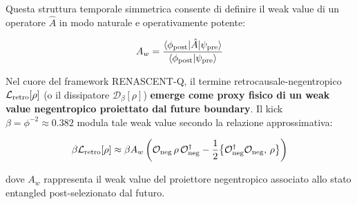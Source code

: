 \documentclass[11pt,a4paper]{article}
\theoremstyle{plain}
\theoremstyle{definition}
\begin{document}
\vspace{0.3cm}

Questa struttura temporale simmetrica consente di definire il weak value di un operatore $\hat{A}$ in modo naturale e operativamente potente:

\vspace{0.4cm}

\begin{tcolorbox}[
  colback=blue!3!white, 
  colframe=blue!80!black, 
  title=Weak Value nel formalismo TSVF, 
  fonttitle=\bfseries,
  breakable,
  enhanced,
  width=\textwidth,
  boxrule=0.9pt,
  arc=6pt
]
\begin{equation}
A_w = \frac{\langle \phi_{\rm post} | \hat{A} | \psi_{\rm pre} \rangle}{\langle \phi_{\rm post} | \psi_{\rm pre} \rangle}
\label{eq:weak_value_tsvf}
\end{equation}
\end{tcolorbox}

\vspace{0.5cm}

Nel cuore del framework RENASCENT-Q, il termine retrocausale-negentropico $\mathcal{L}_{\rm retro}[\rho]$ (o il dissipatore $\mathcal{D}_\beta[\rho]$) \textbf{emerge come proxy fisico di un weak value negentropico proiettato dal future boundary}. Il kick $\beta = \phi^{-2} \approx 0.382$ modula tale weak value secondo la relazione approssimativa:

\vspace{0.2cm}

\begin{tcolorbox}[
  colback=violet!3!white, 
  colframe=violet!70!black, 
  title=Termine retrocausale come weak value negentropico, 
  fonttitle=\bfseries,
  breakable,
  enhanced,
  width=\textwidth,
  boxrule=0.9pt,
  arc=6pt
]
\begin{equation}
\beta \mathcal{L}_{\rm retro}[\rho] \approx \beta A_w \left( \mathcal{O}_{\rm neg}\,\rho\,\mathcal{O}_{\rm neg}^\dagger 
- \frac{1}{2}\bigl\{\mathcal{O}_{\rm neg}^\dagger \mathcal{O}_{\rm neg},\,\rho\bigr\} \right)
\label{eq:retro_proxy_tsvf}
\end{equation}
\end{tcolorbox}


\vspace{0.4cm}

dove $A_w$ rappresenta il weak value del proiettore negentropico associato allo stato entangled post-selezionato dal futuro.


\vspace{0.4cm}
\end{document}
